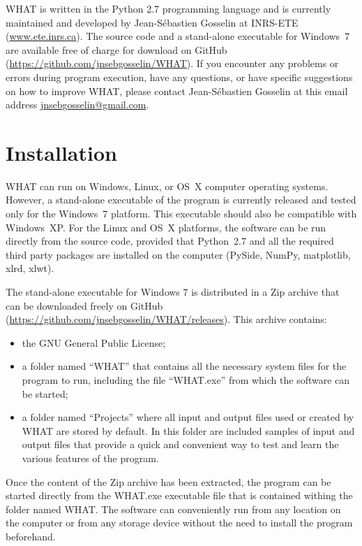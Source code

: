 \documentclass[WHATMANUAL.tex]{subfiles}
\begin{document}
WHAT is written in the Python 2.7 programming language and is currently maintained and developed by Jean-Sébastien Gosselin at INRS-ETE (\url{www.ete.inrs.ca}). The source code and a stand-alone executable for Windows 7 are available free of charge for download on GitHub (\url{https://github.com/jnsebgosselin/WHAT}). If you encounter any problems or errors during program execution, have any questions, or have specific suggestions on how to improve WHAT, please contact Jean-Sébastien Gosselin at this email address \href{mailto:jnsebgosselin@gmail.com}{jnsebgosselin@gmail.com}.

\newpage

\section{Installation}\label{sec:intallation}

WHAT can run on Windows, Linux, or OS X computer operating systems. However, a stand-alone executable of the program is currently released and tested only for the Windows 7 platform. This executable should also be compatible with Windows XP. For the Linux and OS X platforms, the software can be run directly from the source code, provided that Python 2.7 and all the required third party packages are installed on the computer (PySide, NumPy, matplotlib, xlrd, xlwt).

The stand-alone executable for Windows 7 is distributed in a Zip archive that can be downloaded freely on GitHub (\url{https://github.com/jnsebgosselin/WHAT/releases}). This archive contains:

\begin{itemize}

\item the GNU General Public License;

\item a folder named ``WHAT'' that contains all the necessary system files for the program to run, including the file ``WHAT.exe'' from which the software can be started;

\item a folder named ``Projects'' where all input and output files used or created by WHAT are stored by default. In this folder are included samples of input and output files that provide a quick and convenient way to test and learn the various features of the program.

\end{itemize}

Once the content of the Zip archive has been extracted, the program can be started directly from the WHAT.exe executable file that is contained withing the folder named WHAT. The software can conveniently run from any location on the computer or from any storage device without the need to install the program beforehand.
\end{document}
